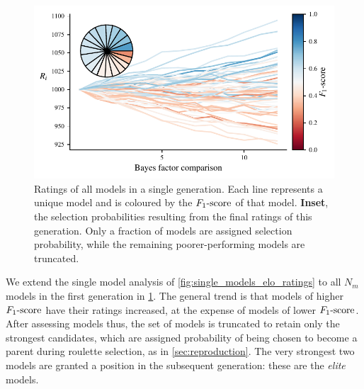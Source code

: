 \par 
\begin{figure}
    \begin{center}
        \includegraphics{theoretical_study/figures/single_generation_all_ratings.pdf}
    \end{center}
    \caption[Ratings of all models in a single  generation.]{
        Ratings of all models in a single  generation.
        Each line represents a unique model and is coloured by the $ F_{1}\text{-score} $ of that model. 
        \textbf{Inset}, the selection probabilities resulting from the final ratings of this generation. 
        Only a fraction of models are assigned selection probability, while the remaining poorer-performing 
        models are truncated. 
    }
    \label{fig:single_generation_all_ratings}
\end{figure}

We extend the single model analysis of \cref{fig:single_models_elo_ratings} to all $N_m$ models 
    in the first generation in \cref{fig:single_generation_all_ratings}.
The general trend is that models of higher $ F_{1}\text{-score} $ have their ratings increased, 
    at the expense of models of lower $ F_{1}\text{-score} $. 
After assessing models thus, the set of models is truncated to retain only the strongest candidates,
    which are assigned probability of being chosen to become a parent during roulette selection, 
    as in \cref{sec:reproduction}.
The very strongest two models are granted a position in the subsequent generation: 
    these are the \emph{elite} models. 

